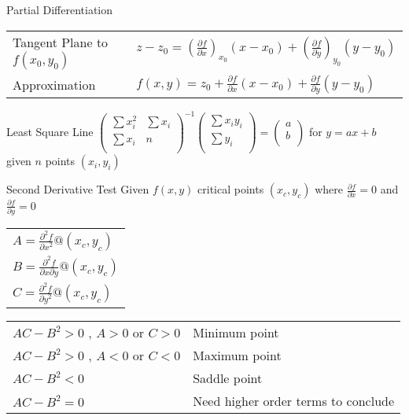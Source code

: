 \begin{section}{Partial Differentiation}
  \begin{tabular}{l l}
    Tangent Plane to $f(x_{0},y_{0})$ & \begin{math}
      z-z_0 =(\frac{\partial{f}}{\partial{x}})_{x_{0}}(x-x_0) + (\frac{\partial{f}}{\partial{y}})_{y_{0}}(y-y_0)
      \end{math} \\
    Approximation & $f(x,y)=z_0 + \frac{\partial{f}}{\partial{x}}(x-x_0) + \frac{\partial{f}}{\partial{y}}(y-y_0)$ \\

  \end{tabular}
  \begin{section}{Least Square Line}
    \begin{math}
      \begin{pmatrix}
        \sum x_i^2 & \sum x_i \\
        \sum x_i & n \\
      \end{pmatrix}^{-1}
      \begin{pmatrix}
        \sum x_i y_i \\
        \sum y_i \\
      \end{pmatrix}
      =
      \begin{pmatrix}
        a \\
        b \\
      \end{pmatrix}
    \end{math}
    for $y = ax + b$ given $n$ points $(x_i,y_i)$
  \end{section}
  \begin{section}{Second Derivative Test}
    Given $f(x,y)$ critical points $(x_c,y_c)$ where $\frac{\partial{f}}{\partial{x}}=0$ and  $\frac{\partial{f}}{\partial{y}}=0$

    \begin{tabular}{l}
      $A = \frac{\partial^2{f}}{\partial{x}^2}@(x_c,y_c)$ \\
      $B = \frac{\partial^2{f}}{\partial{x}\partial{y}}@(x_c,y_c)$ \\
      $C = \frac{\partial^2{f}}{\partial{y}^2}@(x_c,y_c)$ \\
    \end{tabular}

    \begin{tabular}{l l}
      $AC-B^2 > 0$ , $A>0$ or $C>0$  & Minimum point \\
      $AC-B^2 > 0$ , $A<0$ or $C<0$  & Maximum point \\
      $AC-B^2 < 0$  & Saddle point \\
      $AC-B^2 = 0$  & Need higher order terms to conclude \\
    \end{tabular}


\end{section}
\end{section}
